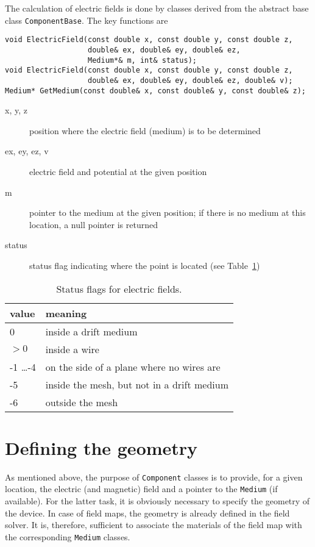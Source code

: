 The calculation of electric fields is done by classes 
derived from the abstract base class \texttt{ComponentBase}. 
The key functions are 
\begin{lstlisting}
void ElectricField(const double x, const double y, const double z,
                   double& ex, double& ey, double& ez,
                   Medium*& m, int& status);
void ElectricField(const double x, const double y, const double z,
                   double& ex, double& ey, double& ez, double& v);
Medium* GetMedium(const double& x, const double& y, const double& z);
\end{lstlisting}
\begin{description}
  \item[x, y, z] 
  position where the electric field (medium) is to be determined
  \item[ex, ey, ez, v] 
  electric field and potential at the given position
  \item[m] pointer to the medium at the given position; 
  if there is no medium at this location, a null pointer is returned
  \item[status] status flag indicating where the point is located
  (see Table~\ref{Tab:StatusFlagsField})
\end{description}

\begin{table} 
  \centering
  \begin{tabular}{l l}
  \toprule
  value & meaning \\
  \midrule
    0   & inside a drift medium \\
  \(> 0\) & inside a wire \\
   -1 \dots -4  &  on the side of a plane where no wires are \\
   -5   & inside the mesh, but not in a drift medium \\
   -6   & outside the mesh \\
  \bottomrule
  \end{tabular}
  \caption{Status flags for electric fields.}
  \label{Tab:StatusFlagsField}
\end{table}

\section{Defining the geometry}

As mentioned above, the purpose of \texttt{Component} classes is to 
provide, for a given location, the electric (and magnetic) field and a pointer to the 
\texttt{Medium} (if available).
For the latter task, it is obviously necessary to specify the geometry 
of the device. 
In case of field maps, the geometry is already defined in the field solver. 
It is, therefore, sufficient to associate the materials 
of the field map with the corresponding \texttt{Medium} classes. 

